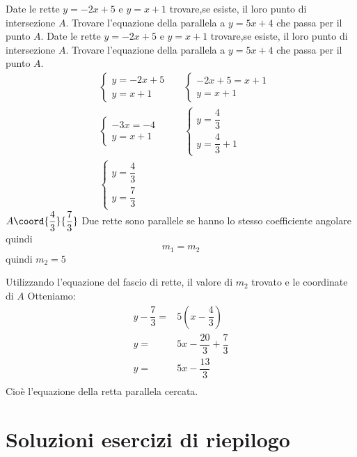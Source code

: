 \begin{exercise}
	Date le rette $y=-2x+5$ e $y=x+1$ trovare,se esiste, il loro punto di intersezione $A$. Trovare l'equazione della parallela a $y=5x+4$ che passa per il punto $A$.
	\tcblower
	Date le rette $y=-2x+5$ e $y=x+1$ trovare,se esiste, il loro punto di intersezione $A$. Trovare l'equazione della parallela a $y=5x+4$ che passa per il punto $A$.
	\begin{align*}
	&\begin{cases}
	y=-2x+5\\
	y=x+1
	\end{cases}
	&&\begin{cases}
	-2x+5=x+1\\
	y=x+1
	\end{cases}\\
	&\begin{cases}
	-3x=-4\\
	y=x+1
	\end{cases}
	&&\begin{cases}
	y=\dfrac{4}{3}\\[.5em]
	y=\dfrac{4}{3}+1
	\end{cases}\\
	&\begin{cases}
y=\dfrac{4}{3}\\[.5em]
y=\dfrac{7}{3}
	\end{cases}
	\end{align*}
	$A\coord{\dfrac{4}{3}}{\dfrac{7}{3}}$
	Due rette sono parallele se hanno lo stesso coefficiente angolare quindi \[m_1=m_2 \]
	quindi $m_2=5$
	
	Utilizzando l'equazione del fascio di rette, il valore di $m_2$ trovato e le coordinate di $A$ Otteniamo:
	\begin{align*}
	y-\dfrac{7}{3}=&5(x-\dfrac{4}{3})\\
	y=&5x-\dfrac{20}{3}+\dfrac{7}{3}\\
	y=&5x-\dfrac{13}{3}\\
	\end{align*}
	Cioè l'equazione della retta parallela cercata.
	\begin{center}
		
	\end{center}
	
\end{exercise}
\tcbstoprecording
\newpage
\section{Soluzioni esercizi di riepilogo}
\tcbinputrecords							